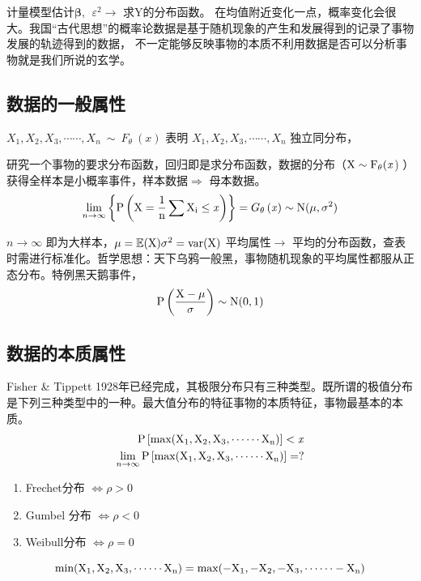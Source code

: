 计量模型估计$ \boldsymbol{\beta} , \ \ \varepsilon^2 \longrightarrow  $ 求Y的分布函数。
在均值附近变化一点，概率变化会很大。我国“古代思想”的概率论数据是基于随机现象的产生和发展得到的记录了事物发展的轨迹得到的数据，
不一定能够反映事物的本质不利用数据是否可以分析事物就是我们所说的玄学。

\subsection{数据的一般属性 } 

$  X_1,X_2,X_3,\cdots\cdots,X_n ~\sim ~F_{\theta} ~ (\mathit {x} ) $ 表明
$  X_1,X_2,X_3,\cdots\cdots,X_n  $ 独立同分布，

研究一个事物的要求分布函数，回归即是求分布函数，数据的分布（$ \rm {X} \sim F_{\theta} (\mathit {x} $) ）获得全样本是小概率事件，样本数据$ \Longrightarrow $ 母本数据。
\begin{eqnarray}
	\lim_{n \to \infty} \left \{ 
	\rm P \left (  X  =  \frac{1}{n} \sum X_i \le \mathit{x}  \right ) \right \}  
	 =  G_{\theta} \left( \mathit{x} \right) \sim \rm N(\mu,\sigma ^2) \notag 
\end{eqnarray}

$  n \to \infty $ 即为大样本，$ \rm \mu = \mathbb{E}(X) \sigma ^2 = var(X)$
平均属性$ \longrightarrow $ 平均的分布函数，查表时需进行标准化。哲学思想：天下乌鸦一般黑，事物随机现象的平均属性都服从正态分布。特例黑天鹅事件，
\begin{eqnarray}
	\rm P \left ( \frac{X-\mu}{\sigma }  \right )  \sim N (0,1) \notag
\end{eqnarray}

\subsection{数据的本质属性 } 

Fisher \&  Tippett 1928年已经完成，其极限分布只有三种类型。既所谓的极值分布是下列三种类型中的一种。最大值分布的特征事物的本质特征，事物最基本的本质。
\begin{eqnarray}
	\rm P \left [ max (X_1,X_2,X_3,\cdots \cdots X_n) \right ] < \it x \notag \\
	\lim_{n \to \infty} \rm P \left [ max (X_1,X_2,X_3,\cdots \cdots X_n) \right ] = ? \notag 
\end{eqnarray}
\begin{enumerate}
	\item \quad  Frechet分布 $ \Leftrightarrow   \rho > 0$
	\item \quad  Gumbel 分布 $ \Leftrightarrow   \rho < 0$
	\item \quad  Weibull分布 $ \Leftrightarrow   \rho = 0$
\end{enumerate}
\begin{equation*}
	 \rm min (X_1,X_2,X_3,\cdots \cdots X_n) = max (-X_1,-X_2,-X_3,\cdots \cdots -X_n)
\end{equation*} 

